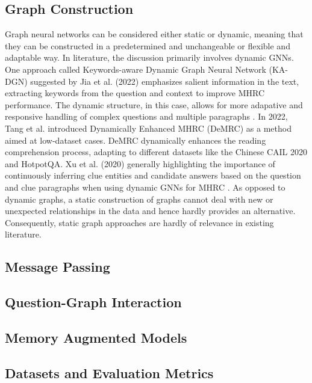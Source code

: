 \documentclass[sigplan,screen]{acmart}
\begin{document}
\subsection{Graph Construction}
Graph neural networks can be considered either static or dynamic, meaning that they can be constructed in a predetermined and unchangeable or flexible 
and adaptable way. In literature, the discussion primarily involves dynamic GNNs. One approach called Keywords-aware Dynamic Graph Neural Network (KA-DGN)
suggested by Jia et al. (2022) \cite{RN171} emphasizes salient information in the text, extracting keywords from the question and context to improve MHRC performance.
The dynamic structure, in this case, allows for more adapative and responsive handling of complex questions and multiple paragraphs \cite{RN171}. In 2022, 
Tang et al. \cite{RN172} introduced Dynamically Enhanced MHRC (DeMRC) as a method aimed at low-dataset cases. DeMRC dynamically enhances the reading comprehension process,
adapting to different datasets like the Chinese CAIL 2020 and HotpotQA. Xu et al. (2020) generally highlighting the importance of continuously inferring
clue entities and candidate answers based on the question and clue paragraphs when using dynamic GNNs for MHRC \cite{RN173}. 
As opposed to dynamic graphs, a static construction of graphs cannot deal with new or unexpected relationships in the data and hence hardly
provides an alternative. Consequently, static graph approaches are hardly of relevance in existing literature. 

\subsection{Message Passing}


\subsection{Question-Graph Interaction}

\subsection{Memory Augmented Models}

\subsection{Datasets and Evaluation Metrics}
\end{document}
